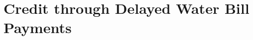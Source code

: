 \documentclass[12pt]{article}
\begin{document}





\section{Credit through Delayed Water Bill Payments}\label{section:descriptives}


\end{document}
